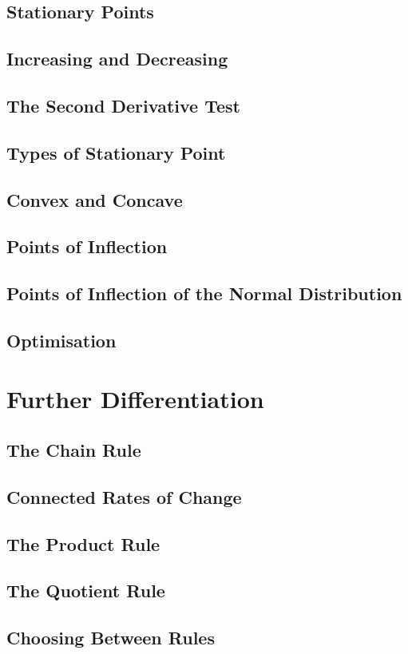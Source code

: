 \documentclass[../maths.tex]{subfiles}
\begin{document}
\subsection*{Stationary Points}
\subsection*{Increasing and Decreasing}
\subsection*{The Second Derivative Test}
\subsection*{Types of Stationary Point}
\subsection*{Convex and Concave}
\subsection*{Points of Inflection}
\subsection*{Points of Inflection of the Normal Distribution}
\subsection*{Optimisation}
\section{Further Differentiation}
\subsection*{The Chain Rule}
\subsection*{Connected Rates of Change}
\subsection*{The Product Rule}
\subsection*{The Quotient Rule}
\subsection*{Choosing Between Rules}
\end{document}
